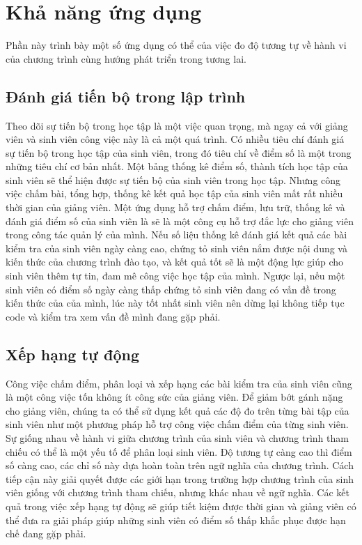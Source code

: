 \section{Khả năng ứng dụng}
Phần này trình bày một số ứng dụng có thể của việc đo độ tương tự về hành vi của chương trình cùng hướng phát triển trong tương lai.

\subsection{Đánh giá tiến bộ trong lập trình}
Theo dõi sự tiến bộ trong học tập là một việc quan trọng, mà ngay cả với giảng viên và sinh viên công việc này là cả một quá trình. Có nhiều tiêu chí đánh giá sự tiến bộ trong học tập của sinh viên, trong đó tiêu chí về điểm số là một trong những tiêu chí cơ bản nhất. Một bảng thống kê điểm số, thành tích học tập của sinh viên sẽ thể hiện được sự tiến bộ của sinh viên trong học tập. Nhưng công việc chấm bài, tổng hợp, thống kê kết quả học tập của sinh viên mất rất nhiều thời gian của giảng viên. Một ứng dụng hỗ trợ chấm điểm, lưu trữ, thống kê và đánh giá điểm số của sinh viên là sẽ là một công cụ hỗ trợ đắc lực cho giảng viên trong công tác quản lý của mình. Nếu số liệu thống kê đánh giá kết quả các bài kiểm tra của sinh viên ngày càng cao, chứng tỏ sinh viên nắm được nội dung và kiến thức của chương trình đào tạo, và kết quả tốt sẽ là một động lực giúp cho sinh viên thêm tự tin, đam mê công việc học tập của mình. Ngược lại, nếu một sinh viên có điểm số ngày càng thấp chứng tỏ sinh viên đang có vấn đề trong kiến thức của của mình, lúc này tốt nhất sinh viên nên dừng lại không tiếp tục code và kiểm tra xem vấn đề mình đang gặp phải. 

\subsection{Xếp hạng tự động}
Công việc chấm điểm, phân loại và xếp hạng các bài kiểm tra của sinh viên cũng là một công việc tốn không ít công sức của giảng viên. Để giảm bớt gánh nặng cho giảng viên, chúng ta có thể sử dụng kết quả các độ đo trên từng bài tập của sinh viên như một phương pháp hỗ trợ công việc chấm điểm của từng sinh viên. Sự giống nhau về hành vi giữa chương trình của sinh viên và chương trình tham chiếu có thể là một yếu tố để phân loại sinh viên. Độ tương tự càng cao thì điểm số càng cao, các chỉ số này dựa hoàn toàn trên ngữ nghĩa của chương trình. Cách tiếp cận này giải quyết được các giới hạn trong trường hợp chương trình của sinh viên giống với chương trình tham chiếu, nhưng khác nhau về ngữ nghĩa. Các kết quả trong việc xếp hạng tự động sẽ giúp tiết kiệm được thời gian và giảng viên có thể đưa ra giải pháp giúp những sinh viên có điểm số thấp khắc phục được hạn chế đang gặp phải.


